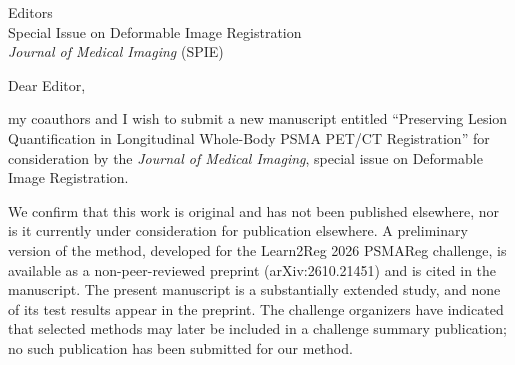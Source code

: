 \documentclass[11pt,a4paper]{letter}
\date{\today}
\begin{document}
\begin{letter}{Editors\\
Special Issue on Deformable Image Registration\\
\textit{Journal of Medical Imaging} (SPIE)}

\opening{Dear Editor,}

my coauthors and I wish to submit a new manuscript entitled ``Preserving Lesion Quantification in Longitudinal Whole-Body PSMA PET/CT Registration'' for consideration by the \textit{Journal of Medical Imaging}, special issue on Deformable Image Registration.

We confirm that this work is original and has not been published elsewhere, nor is it currently under consideration for publication elsewhere.
A preliminary version of the method, developed for the Learn2Reg 2026 PSMAReg challenge, is available as a non-peer-reviewed preprint (arXiv:2610.21451) and is cited in the manuscript.
The present manuscript is a substantially extended study, and none of its test results appear in the preprint.
The challenge organizers have indicated that selected methods may later be included in a challenge summary publication; no such publication has been submitted for our method.


\end{letter}
\end{document}
